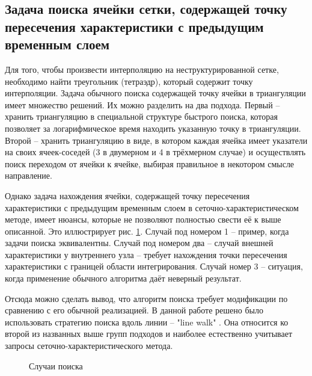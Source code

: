 \subsection{Задача поиска ячейки сетки, содержащей точку пересечения характеристики с предыдущим временным слоем}
Для того, чтобы произвести интерполяцию на неструктурированной сетке, необходимо найти треугольник (тетраэдр), который содержит точку интерполяции. Задача обычного поиска содержащей точку ячейки в триангуляции имеет множество решений. Их можно разделить на два подхода. Первый -- хранить триангуляцию в специальной структуре быстрого поиска, которая позволяет за логарифмическое время находить указанную точку в триангуляции. Второй -- хранить триангуляцию в виде, в котором каждая ячейка имеет указатели на своих ячеек-соседей (3 в двумерном и 4 в трёхмерном случае) и осуществлять поиск переходом от ячейки к ячейке, выбирая правильное в некотором смысле направление.

Однако задача нахождения ячейки, содержащей точку пересечения характеристики с предыдущим временным слоем в сеточно\hyp{}характеристическом методе, имеет нюансы, которые не позволяют полностью свести её к выше описанной. Это иллюстрирует рис. \ref{pic:locate_cell}. Случай под номером 1 -- пример, когда задачи поиска эквивалентны. Случай под номером два -- случай внешней характеристики у внутреннего узла -- требует нахождения точки пересечения характеристики с границей области интегрирования. Случай номер 3 -- ситуация, когда применение обычного алгоритма даёт неверный результат.

Отсюда можно сделать вывод, что алгоритм поиска требует модификации по сравнению с его обычной реализацией. В данной работе решено было использовать стратегию поиска вдоль линии -- "line walk" \cite{line_walker}. Она относится ко второй из названных выше групп подходов и наиболее естественно учитывает запросы сеточно-характеристического метода. 

\begin{figure}%
	\caption{Случаи поиска}
	\label{pic:locate_cell}
\end{figure}

